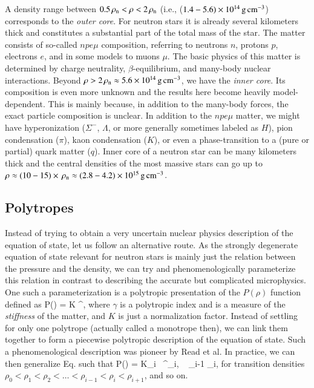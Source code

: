 A density range between $0.5 \, \rho_{\mathrm{n}}  < \rho < 2\, \rho_{\mathrm{n}} $ (i.e., ($1.4 - 5.6) \times 10^{14}\, \mathrm{g}\,\mathrm{cm}^{-3}$) corresponds to the \emph{outer core}.
For neutron stars it is already several kilometers thick and constitutes a substantial part of the total mass of the star.
The matter consists of so-called $npe\mu$ composition, referring to neutrons $n$, protons $p$, electrons $e$, and in some models to muons $\mu$.
The basic physics of this matter is determined by charge neutrality, $\beta$-equilibrium, and many-body nuclear interactions.
Beyond $\rho > 2 \, \rho_{\mathrm{n}}  \approx 5.6 \times 10^{14}\, \mathrm{g}\,\mathrm{cm}^{-3}$, we have the \emph{inner core}.
Its composition is even more unknown and the results here become heavily model-dependent.
This is mainly because, in addition to the many-body forces, the exact particle composition is unclear.
In addition to the $npe\mu$ matter, we might have hyperonization ($\Sigma^{-}$, $\Lambda$, or more generally sometimes labeled as $H$), pion condensation ($\pi$), kaon condensation ($K$), or even a phase-transition to a (pure or partial) quark matter ($q$).
Inner core of a neutron star can be many kilometers thick and the central densities of the most massive stars can go up to $\rho \approx (10-15) \times \, \rho_{\mathrm{n}}  \approx (2.8 - 4.2) \times 10^{15} \, \mathrm{g}\,\mathrm{cm}^{-3}$.


\subsection{Polytropes}

Instead of trying to obtain a very uncertain nuclear physics description of the equation of state, let us follow an alternative route.
As the strongly degenerate equation of state relevant for neutron stars is mainly just the relation between the pressure and the density, we can try and phenomenologically parameterize this relation in contrast to describing the accurate but complicated microphysics.
One such a parameterization is a polytropic presentation of the $P(\rho)$ function defined as
\be\label{eq:monotrope}
P(\rho) = K \rho^{\gamma},
\ee
where $\gamma$ is a polytropic index and is a measure of the \emph{stiffness} of the matter, and $K$ is just a normalization factor.
Instead of settling for only one polytrope (actually called a monotrope then), we can link them together to form a piecewise polytropic description of the equation of state.
Such a phenomenological description was pioneer by Read et al.\cite{Read09}
In practice, we can then generalize Eq. such that
\be
P(\rho) = K_i \, \rho^{\gamma_i}, \quad {}~ \rho_{i-1} \le \rho \le \rho_{i},
\ee
for transition densities $\rho_0 < \rho_1 < \rho_2  < \ldots < \rho_{i-1} < \rho_{i} < \rho_{i+1}$, and so on. 

